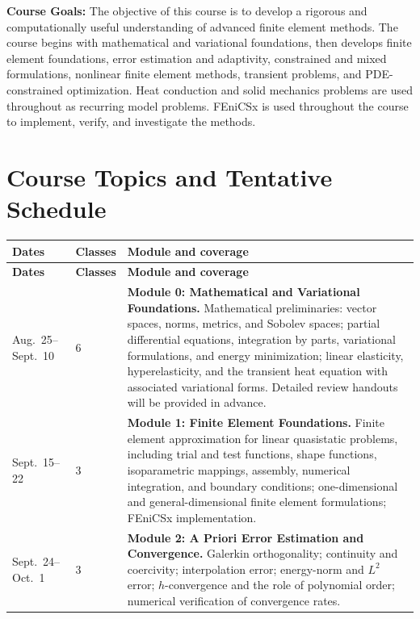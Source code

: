 \documentclass[12pt]{article}
\newcommand{\coursefield}[2]{%
  \vspace{0.2em}\noindent\textbf{#1} #2\par
}
\begin{document}
\coursefield{Course Goals:}{The objective of this course is to develop a rigorous and computationally useful understanding of advanced finite element methods. The course begins with mathematical and variational foundations, then develops finite element foundations, error estimation and adaptivity, constrained and mixed formulations, nonlinear finite element methods, transient problems, and PDE-constrained optimization. Heat conduction and solid mechanics problems are used throughout as recurring model problems. FEniCSx is used throughout the course to implement, verify, and investigate the methods.}

\section{Course Topics and Tentative Schedule}
{
\small
\setlength{\tabcolsep}{4pt}
\renewcommand{\arraystretch}{1.12}
\begin{longtable}{L{0.6in} C{0.48in} L{5.08in}}
\textbf{Dates} & \textbf{Classes} & \textbf{Module and coverage}\\
\endfirsthead
{}
\textbf{Dates} & \textbf{Classes} & \textbf{Module and coverage}\\
\endhead
Aug.\ 25--Sept.\ 10 & 6 &
\textbf{Module 0: Mathematical and Variational Foundations.}
Mathematical preliminaries: vector spaces, norms, metrics, and Sobolev spaces; partial differential equations, integration by parts, variational formulations, and energy minimization; linear elasticity, hyperelasticity, and the transient heat equation with associated variational forms. Detailed review handouts will be provided in advance. \\[0.18em]

Sept.\ 15--22 & 3 &
\textbf{Module 1: Finite Element Foundations.}
Finite element approximation for linear quasistatic problems, including trial and test functions, shape functions, isoparametric mappings, assembly, numerical integration, and boundary conditions; one-dimensional and general-dimensional finite element formulations; FEniCSx implementation.\\[0.18em]

Sept.\ 24--Oct.\ 1 & 3 &
\textbf{Module 2: A Priori Error Estimation and Convergence.}
Galerkin orthogonality; continuity and coercivity; interpolation error; energy-norm and $L^2$ error; $h$-convergence and the role of polynomial order; numerical verification of convergence rates.\\[0.18em]


\end{longtable}}
\end{document}
